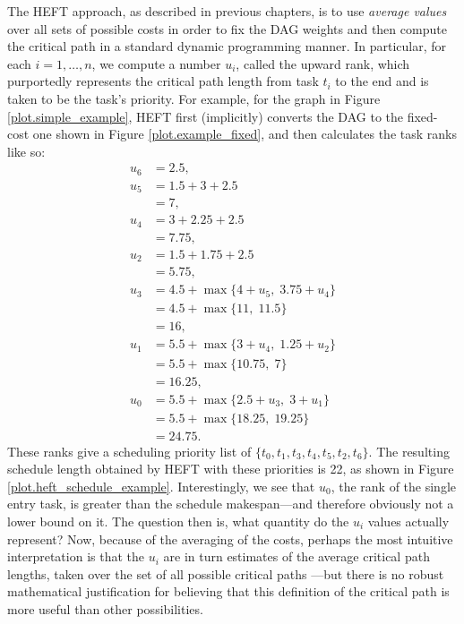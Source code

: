 \documentclass[12pt]{article}
\begin{document}
The HEFT approach, as described in previous chapters, is to use {\em average values} over all sets of possible costs in order to fix the DAG weights and then compute the critical path in a standard dynamic programming manner. In particular, for each $i = 1, \dots, n$, we compute a number $u_i$, called the upward rank, which purportedly represents the critical path length from task $t_i$ to the end and is taken to be the task's priority. For example, for the graph in Figure \ref{plot.simple_example}, HEFT first (implicitly) converts the DAG to the fixed-cost one shown in Figure \ref{plot.example_fixed}, and then calculates the task ranks like so: 
\begin{align*}
u_6 &= 2.5, \\
u_5 &= 1.5 + 3 + 2.5 \\
&= 7, \\
u_4 &= 3 + 2.25 + 2.5 \\
&= 7.75, \\
u_2 &= 1.5 + 1.75 + 2.5\\
&= 5.75, \\
u_3 &= 4.5 + \max\{ 4 + u_5, \; 3.75 + u_4 \} \\
&= 4.5 + \max\{ 11, \; 11.5 \}\\
&= 16, \\
u_1 &= 5.5 + \max\{ 3 + u_4, \; 1.25 + u_2 \} \\
&= 5.5 + \max\{ 10.75, \; 7 \}\\
&= 16.25, \\
u_0 &= 5.5 + \max\{ 2.5 + u_3, \; 3 + u_1 \} \\
&= 5.5 + \max\{ 18.25, \; 19.25 \} \\
&= 24.75.
\end{align*}
These ranks give a scheduling priority list of $\{t_0, t_1, t_3, t_4, t_5, t_2, t_6\}$. The resulting schedule length obtained by HEFT with these priorities is 22, as shown in Figure \ref{plot.heft_schedule_example}. Interestingly, we see that $u_0$, the rank of the single entry task, is greater than the schedule makespan---and therefore obviously not a lower bound on it. The question then is, what quantity do the $u_i$ values actually represent? Now, because of the averaging of the costs, perhaps the most intuitive interpretation is that the $u_i$ are in turn estimates of the average critical path lengths, taken over the set of all possible critical paths ---but there is no robust mathematical justification for believing that this definition of the critical path is more useful than other possibilities.
\end{document}
